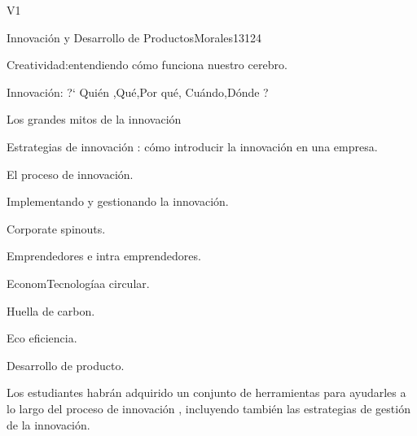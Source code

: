 \begin{syllabus}
\begin{competences}{V1}
    \item {}
    \item {}
    \item {}
    \item {}
\end{competences}

\begin{unit}{Innovación y Desarrollo de Productos}{}{Morales13}{12}{4}
   \begin{topics}
      \item Creatividad:entendiendo cómo funciona nuestro cerebro.
      \item Innovación: ?` Quién ,Qué,Por qué, Cuándo,Dónde ?
      \item Los grandes mitos de la innovación
      \item Estrategias de innovación : cómo introducir la innovación en una empresa.
      \item El proceso de innovación.
      \item Implementando y gestionando la innovación.
      \item Corporate spinouts.
      \item Emprendedores e intra emprendedores.
      \item EconomTecnologíaa circular.
      \item Huella de carbon.
      \item Eco eficiencia.
      \item Desarrollo de producto.
   \end{topics}
   \begin{learningoutcomes}
      \item Los estudiantes habrán adquirido un conjunto de herramientas para ayudarles a lo largo del proceso de innovación , incluyendo también las estrategias de gestión de la innovación.
   \end{learningoutcomes}
\end{unit}

\begin{coursebibliography}
\end{coursebibliography}

\end{syllabus}
